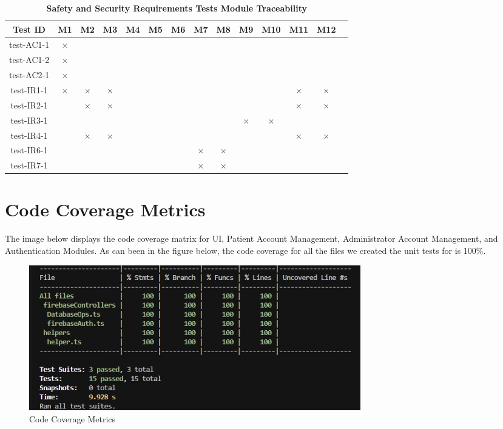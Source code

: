\documentclass[12pt, titlepage]{article}
\begin{document}
\begin{table} [H]
  \centering
  \begin{tabular}{|c|c|c|c|c|c|c|c|c|c|c|c|c|c|}
  \hline
  Test ID & M1 & M2 & M3 & M4 & M5 & M6 & M7 & M8 & M9 & M10 & M11 & M12 \\
  \hline
  test-AC1-1 & $\times$ & & & & & & & & & & & \\
  \hline
  test-AC1-2 & $\times$ & & & & & & & & & & & \\
  \hline
  test-AC2-1 & $\times$ & & & & & & & & & & & \\
  \hline
  test-IR1-1 & $\times$ & $\times$ & $\times$ & & & & & & & & $\times$ & $\times$\\
  \hline
  test-IR2-1 & & $\times$ & $\times$ & & & & & & & & $\times$ & $\times$\\
  \hline
  test-IR3-1 & & & & & & & & & $\times$ & $\times$ & &\\
  \hline
  test-IR4-1 & & $\times$ & $\times$ & & & & & & & & $\times$ & $\times$\\
  \hline
  test-IR6-1 & & & & & & & $\times$ & $\times$ & & & &\\
  \hline
  test-IR7-1 & & & & & & & $\times$ & $\times$ & & & &\\
  \hline
\end{tabular}
\caption{\bf Safety and Security Requirements Tests Module Traceability} \label{tab:sns-test-traceability}
\end{table}

\newpage

\section{Code Coverage Metrics}

The image below displays the code coverage matrix for UI, Patient Account Management, Administrator Account Management, and Authentication Modules. As can been in the figure below, the code coverage for all the files we created the unit tests for is 100\%. 

\begin{figure}[h]
  \centering
  \includegraphics[width=0.7\textwidth]{CodeCoverageMetrics.jpg}
  \caption{Code Coverage Metrics}
  \label{FigUH}
\end{figure}
\end{document}
